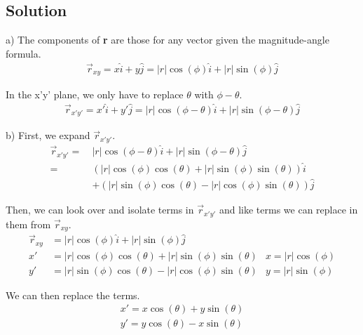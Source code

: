 \documentclass[12pt]{article}
\begin{document}
\subsection*{Solution}

a) The components of \textbf{r} are those for any vector given the magnitude-angle formula.
\begin{eqnarray*}
    \boxed{\Vec{r}_{xy} = x\hat{i} + y\hat{j} = |r|\cos(\phi)\hat{i} + |r|\sin(\phi)\hat{j}}
\end{eqnarray*}

In the x'y' plane, we only have to replace $\theta$ with $\phi-\theta$.
\begin{eqnarray*}
    \boxed{\Vec{r}_{x'y'} = x'\hat{i} + y'\hat{j} = |r|\cos(\phi-\theta)\hat{i} + |r|\sin(\phi-\theta)\hat{j}}
\end{eqnarray*}
\pagebreak

b) First, we expand $\Vec{r}_{x'y'}$.
\begin{align*}
    \Vec{r}_{x'y'} =\ &|r|\cos(\phi-\theta)\hat{i} + |r|\sin(\phi-\theta)\hat{j}\\
                    =\ &(|r|\cos(\phi)\cos(\theta) + |r|\sin(\phi)\sin(\theta))\hat{i}\\ 
                    &+ (|r|\sin(\phi)\cos(\theta) - |r|\cos(\phi)\sin(\theta))\hat{j}
\end{align*}

Then, we can look over and isolate terms in $\Vec{r}_{x'y'}$ and like terms we can replace in them from $\Vec{r}_{xy}$.
\begin{align*}
    \Vec{r}_{xy} &= |r|\cos(\phi)\hat{i} + |r|\sin(\phi)\hat{j}\\
    x' &= |r|\cos(\phi)\cos(\theta) + |r|\sin(\phi)\sin(\theta) &x = |r|\cos(\phi)\\
    y' &= |r|\sin(\phi)\cos(\theta) - |r|\cos(\phi)\sin(\theta) &y = |r|\sin(\phi)
\end{align*}

We can then replace the terms.
\begin{align*}
    \boxed{x' = x\cos(\theta) + y\sin(\theta)}\\
    \boxed{y' = y\cos(\theta) - x\sin(\theta)}
\end{align*}
\end{document}
